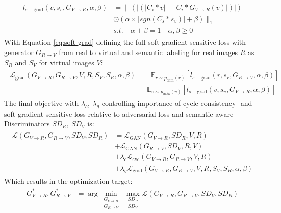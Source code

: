 \begin{align}
	\begin{split}
		l_{s-\text{grad}}(v, s_v, G_{V\rightarrow R}, \alpha, \beta) &= \lVert(|(|C_i*v|-|C_i*G_{V\rightarrow R}(v)|)|)\\
		&\odot (\alpha \times |sgn(C_s*s_v)|+\beta)\rVert_1\\
		&s.t. \quad \alpha + \beta = 1 \quad \alpha, \beta \geq 0
	\end{split} 
	\label{eq:soft-grad}
\end{align}
With Equation \ref{eq:soft-grad} defining the full soft gradient-sensitive loss with generator $G_{R\rightarrow V}$ from real to virtual and semantic labeling for real images $R$ as $S_R$ and $S_V$ for virtual images $V$:
\begin{align}
	\begin{split}
		\mathcal{L}_{\text{grad}}(G_{V\rightarrow R}, G_{R\rightarrow V}, V, R, S_V, S_R, \alpha, \beta) &= \mathbb{E}_{r\sim p_{\text{data}}(r)}[l_{s-\text{grad}}(r,s_r, G_{R\rightarrow V}, \alpha, \beta)]\\
		&+ \mathbb{E}_{v\sim p_{\text{data}}(v)}[l_{s-\text{grad}}(v,s_v, G_{V\rightarrow R}, \alpha, \beta)]
	\end{split}
\end{align}
The final objective with $\lambda_c, ~ \lambda_g$ controlling importance of cycle consistency- and soft gradient-sensitive loss relative to adversarial loss and semantic-aware Discriminators $SD_R,~SD_V$ is:
\begin{align}
	\begin{split}
		\mathcal{L}(G_{V\rightarrow R}, G_{R\rightarrow V}, SD_V, SD_R) &= \mathcal{L}_{\text{GAN}}(G_{V\rightarrow R}, SD_R, V, R)\\
		&+ \mathcal{L}_{\text{GAN}}(G_{R\rightarrow V}, SD_V, R, V)\\
		&+ \lambda_c \mathcal{L}_{\text{cyc}}(G_{V\rightarrow R}, G_{R\rightarrow V}, V, R)\\
		&+ \lambda_g \mathcal{L}_{\text{grad}}(G_{V\rightarrow R}, G_{R\rightarrow V}, V, R, S_V, S_R, \alpha, \beta)
	\end{split}
	\label{eq:final_obj_SG-GAN}
\end{align}
Which results in the optimization target:
\begin{align}
	G^*_{V\rightarrow R}, G^*_{R\rightarrow V} &= \arg \underset{\substack{G_{V\rightarrow R}\\ G_{R\rightarrow V}}}{\min}~ \underset{\substack{SD_R\\SD_V}}{\max}\mathcal{L}(G_{V\rightarrow R}, G_{R\rightarrow V}, SD_V, SD_R)
\end{align}

